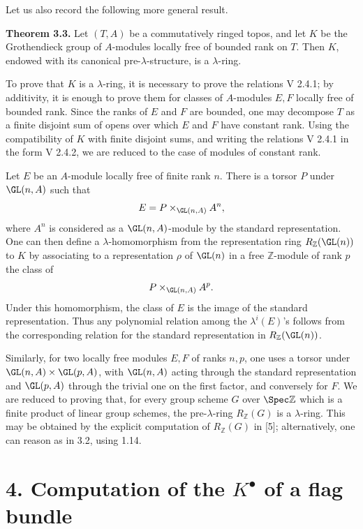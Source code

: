Let us also record the following more general result.

\textbf{Theorem 3.3.} Let \((T,A)\) be a commutatively ringed topos, and let \(K\) be the Grothendieck group of \(A\)-modules locally free of bounded rank on \(T\). Then \(K\), endowed with its canonical pre-\(\lambda\)-structure, is a \(\lambda\)-ring.

To prove that \(K\) is a \(\lambda\)-ring, it is necessary to prove the relations V 2.4.1; by additivity, it is enough to prove them for classes of \(A\)-modules \(E,F\) locally free of bounded rank. Since the ranks of \(E\) and \(F\) are bounded, one may decompose \(T\) as a finite disjoint sum of opens over which \(E\) and \(F\) have constant rank. Using the compatibility of \(K\) with finite disjoint sums, and writing the relations V 2.4.1 in the form V 2.4.2, we are reduced to the case of modules of constant rank.

Let \(E\) be an \(A\)-module locally free of finite rank \(n\). There is a torsor \(P\) under \(\GL(n,A)\) such that
\[
  E=P\times_{\GL(n,A)} A^n,
\]
where \(A^n\) is considered as a \(\GL(n,A)\)-module by the standard representation. One can then define a \(\lambda\)-homomorphism from the representation ring \(R_{\mathbb Z}(\GL(n))\) to \(K\) by associating to a representation \(\rho\) of \(\GL(n)\) in a free \(\mathbb Z\)-module of rank \(p\) the class of
\[
  P\times_{\GL(n,A)} A^p.
\]
Under this homomorphism, the class of \(E\) is the image of the standard representation. Thus any polynomial relation among the \(\lambda^i(E)\)'s follows from the corresponding relation for the standard representation in \(R_{\mathbb Z}(\GL(n))\).

Similarly, for two locally free modules \(E,F\) of ranks \(n,p\), one uses a torsor under \(\GL(n,A)\times\GL(p,A)\), with \(\GL(n,A)\) acting through the standard representation and \(\GL(p,A)\) through the trivial one on the first factor, and conversely for \(F\). We are reduced to proving that, for every group scheme \(G\) over \(\Spec\mathbb Z\) which is a finite product of linear group schemes, the pre-\(\lambda\)-ring \(R_{\mathbb Z}(G)\) is a \(\lambda\)-ring. This may be obtained by the explicit computation of \(R_{\mathbb Z}(G)\) in [5]; alternatively, one can reason as in 3.2, using 1.14.

\section*{4. Computation of the \(K^\bullet\) of a flag bundle}

